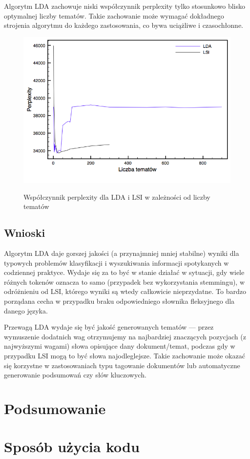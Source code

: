 \documentclass[11pt,a4paper]{article}
\begin{document}
Algorytm LDA zachowuje niski współczynnik perplexity tylko stosunkowo blisko
optymalnej liczby tematów. Takie zachowanie może wymagać dokładnego strojenia
algorytmu do każdego zastosowania, co bywa uciążliwe i czasochłonne.

\begin{figure}[h]
\caption{Współczynnik perplexity dla LDA i LSI w zależności od liczby tematów}
\includegraphics[width=\linewidth]{gfx/perplexity.png}
\label{fig:perplexity}
\end{figure}

\FloatBarrier

\subsection{Wnioski}

Algorytm LDA daje gorszej jakości (a przynajmniej mniej stabilne) wyniki dla
typowych problemów klasyfikacji i wyszukiwania informacji spotykanych w
codziennej praktyce. Wydaje się za to być w stanie działać w sytuacji, gdy
wiele różnych tokenów oznacza to samo (przypadek bez wykorzystania stemmingu),
w odróżnieniu od LSI, którego wyniki są wtedy całkowicie nieprzydatne. To
bardzo porządana cecha w przypadku braku odpowiedniego słownika fleksyjnego dla
danego języka.

Przewagą LDA wydaje się być jakość generowanych tematów --- przez wymuszenie
dodatnich wag otrzymujemy na najbardziej znaczących pozycjach (z najwyższymi
wagami) słowa opisujące dany dokument/temat, podczas gdy w przypadku LSI mogą
to być słowa najodleglejsze. Takie zachowanie może okazać się korzystne w
zastosowaniach typu tagowanie dokumentów lub automatyczne generowanie
podsumowań czy słów kluczowych.

\section{Podsumowanie}

\appendix
\section{Sposób użycia kodu}

\listoftables
{}
\listoffigures
{}



\enddocument
\end{document}
